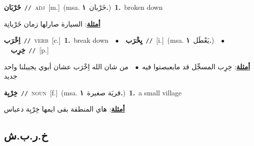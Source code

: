 \documentclass[10pt,a4paper,twoside]{article} %
\begin{document}
\begin{multicols}{2}
{{{{{{{{{{{\setlength\topsep{0pt}\textbf{\foreignlanguage{arabic}{خَرْبَان}}\ {\color{gray}\texttt{//}\color{black}}\ \textsc{adj}\ [m.]\ \color{gray}(msa. \foreignlanguage{arabic}{خَرْبان}~\foreignlanguage{arabic}{\textbf{١.}})\color{black}\ \textbf{1.}~broken down\  \begin{flushright}\color{gray}\foreignlanguage{arabic}{\textbf{\underline{\foreignlanguage{arabic}{أمثلة}}}: السيارة صارلها زمان خَرْبانِة}\end{flushright}\color{black}} \vspace{2mm}

{\setlength\topsep{0pt}\textbf{\foreignlanguage{arabic}{اِخْرَب}}\ {\color{gray}\texttt{//}\color{black}}\ \textsc{verb}\ [c.]\ \textbf{1.}~break down\ \ $\bullet$\ \ \setlength\topsep{0pt}\textbf{\foreignlanguage{arabic}{يِخْرَب}}\ {\color{gray}\texttt{//}\color{black}}\ [i.]\ \color{gray}(msa. \foreignlanguage{arabic}{يَعْطَل}~\foreignlanguage{arabic}{\textbf{١.}})\color{black}\ \ $\bullet$\ \ \setlength\topsep{0pt}\textbf{\foreignlanguage{arabic}{خِرِب}}\ {\color{gray}\texttt{//}\color{black}}\ [p.]\  \begin{flushright}\color{gray}\foreignlanguage{arabic}{\textbf{\underline{\foreignlanguage{arabic}{أمثلة}}}: خِرِب المسجِّل قد مابعبصتوا فيه\ $\bullet$\ \  من شان الله اِخْرَب عشان أبوي يجيبلنا واحد جديد}\end{flushright}\color{black}} \vspace{2mm}

{\setlength\topsep{0pt}\textbf{\foreignlanguage{arabic}{خِرْبِة}}\ {\color{gray}\texttt{//}\color{black}}\ \textsc{noun}\ [f.]\ \color{gray}(msa. \foreignlanguage{arabic}{قريَة صغيرة}~\foreignlanguage{arabic}{\textbf{١.}})\color{black}\ \textbf{1.}~a small village\  \begin{flushright}\color{gray}\foreignlanguage{arabic}{\textbf{\underline{\foreignlanguage{arabic}{أمثلة}}}: هاي المنطقة بقى ايمها خِرْبِة دعباس}\end{flushright}\color{black}} \vspace{2mm}

\vspace{-3mm}
\subsection*{\color{blue}\foreignlanguage{arabic}{خ.ر.ب.ش}\color{blue}{}} 

}}}}}}}}}}
\end{multicols}
\end{document}
